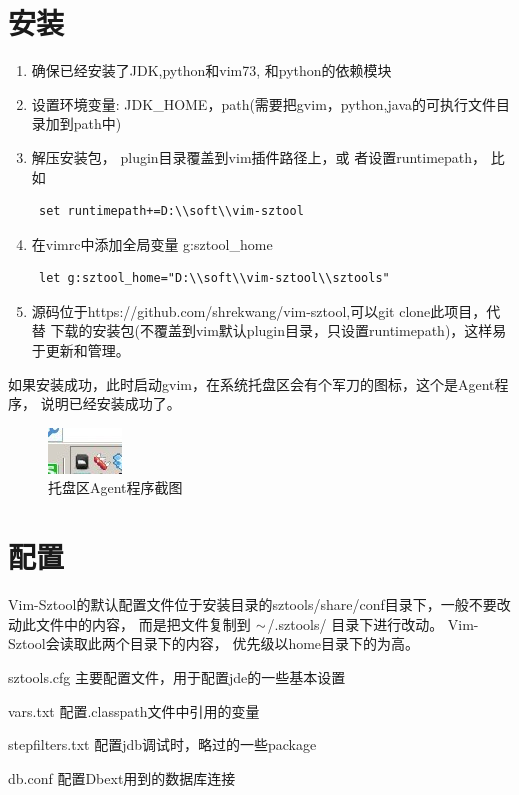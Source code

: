 \documentclass[oneside,openany]{book}
\begin{document}
  \section{安装}
    \begin{enumerate}
      \item 确保已经安装了JDK,python和vim73, 和python的依赖模块
      \item 设置环境变量: JDK\_HOME，path(需要把gvim，python,java的可执行文件目录加到path中)
      \item 解压安装包， plugin目录覆盖到vim插件路径上，或
      者设置runtimepath， 比如
      \begin{verbatim} set runtimepath+=D:\\soft\\vim-sztool \end{verbatim}
      \item 在vimrc中添加全局变量 g:sztool\_home
      \begin{verbatim} let g:sztool_home="D:\\soft\\vim-sztool\\sztools" \end{verbatim}
      \item 源码位于https://github.com/shrekwang/vim-sztool,可以git clone此项目，代替
      下载的安装包(不覆盖到vim默认plugin目录，只设置runtimepath)，这样易于更新和管理。
    \end{enumerate}
   如果安装成功，此时启动gvim，在系统托盘区会有个军刀的图标，这个是Agent程序，
   说明已经安装成功了。

   \begin{figure}[htbp]%
      \centering
      \includegraphics[scale=0.8]{tray.jpg}
      \caption{托盘区Agent程序截图}
  \end{figure}

  \section{配置}
    Vim-Sztool的默认配置文件位于安装目录的sztools/share/conf目录下，一般不要改动此文件中的内容，
  而是把文件复制到 $\tiny{\sim}$/.sztools/ 目录下进行改动。 Vim-Sztool会读取此两个目录下的内容，
  优先级以home目录下的为高。
  \begin{description}
    \item{sztools.cfg} 主要配置文件，用于配置jde的一些基本设置
    \item{vars.txt} 配置.classpath文件中引用的变量
    \item{stepfilters.txt} 配置jdb调试时，略过的一些package
    \item{db.conf} 配置Dbext用到的数据库连接
  \end{description}
  
\end{document}
